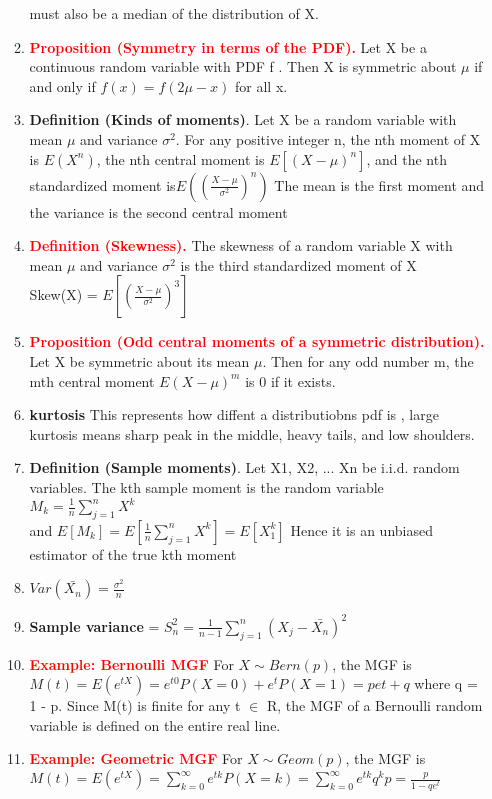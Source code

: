 \documentclass[11pt]{article}
\begin{document}
\begin{enumerate}
\begin{enumerate}
	must also be a median of the distribution of X.
	\item \textcolor{red}{\textbf{Proposition (Symmetry in terms of the PDF).}} Let X be a continuous random variable with PDF f . Then X
	is symmetric about $\mu$ if and only if $f (x) = f (2\mu - x)$ for all x.
	\item\textbf{ Definition (Kinds of moments)}. Let X be a random variable with mean $\mu$ and variance $\sigma^2$. For any positive
	integer n, the nth moment of X is $E(X^n)$, the nth central moment is $E[(X-\mu)^n]$, and the nth standardized
	moment is$E((\frac{X-\mu}{\sigma^2})^n)$
	The mean is the first moment and the variance is the second central moment
	\item \textcolor{red}{\textbf{ Definition (Skewness).}} The skewness of a random variable X with mean $\mu$ and variance $\sigma^2$ is the third
	standardized moment of X \\
	Skew(X) = $E[(\frac{X-\mu}{\sigma^2})^3]$
	\item \textcolor{red}{\textbf{Proposition (Odd central moments of a symmetric distribution). }}Let X be symmetric about its mean $\mu$. Then
	for any odd number m, the mth central moment $E(X -\mu)^m$ is 0 if it exists.
	\item \textbf{kurtosis} This represents how diffent a distributiobns pdf is , large kurtosis means sharp peak in the middle, heavy tails, and low shoulders.
	\item \textbf{Definition (Sample moments)}. Let X1, X2, ... Xn be i.i.d. random variables. The kth sample moment is the random variable\\
	$M_k = \frac{1}{n}\sum_{j=1}^{n}X^k$\\ and
	$E[M_k] = E[\frac{1}{n}\sum_{j=1}^{n}X^k] = E[X_1^k]$ Hence it is an unbiased estimator of the true kth moment
	\item $Var(\bar{X_n}) = \frac{\sigma^2}{n}$
	\item \textbf{Sample variance} = $S_n^2=\frac{1}{n-1}\sum_{j=1}^{n}(X_j-\bar{X_n})^2$
	\item \textcolor{red}{\textbf{Example: Bernoulli MGF}}
	For $X \sim Bern(p)$, the MGF is
	$M(t) = E(e^{tX}) = e^{t0}P(X = 0) + e^{t}P(X = 1) = pet + q$
	where q = 1 - p. Since M(t) is finite for any t $\in$ R, the MGF of a Bernoulli random variable is defined on the entire real line.
	\item \textcolor{red}{\textbf{Example: Geometric MGF}}
	For $X \sim Geom(p)$, the MGF is
	$M(t) = E(e^{tX}) =
	\sum_{k=0}^{\infty}
	e^{tk}P(X = k) = \sum_{k=0}^{\infty}e^{tk}q^kp = \frac{p}{1-qe^t}$

\end{enumerate}
\end{enumerate}
\end{document}
